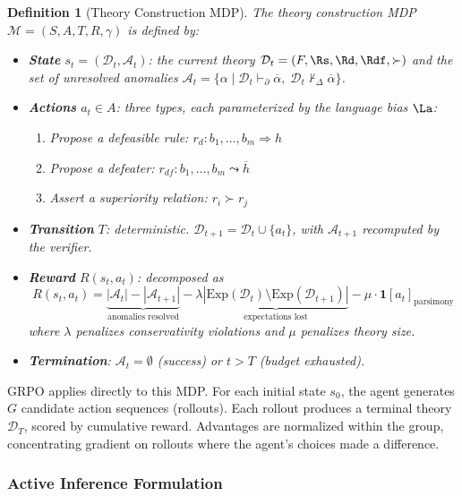 \documentclass[11pt]{article}
\newtheorem{definition}{Definition}
\newcommand{\D}{\mathcal{D}}
\newcommand{\Exp}{\mathrm{Exp}}
\newcommand{\pPartial}{\vdash_{\partial}}
\newcommand{\defto}{\Rightarrow}
\newcommand{\defeatto}{\leadsto}
\newcommand{\comp}[1]{\overline{#1}}
\begin{document}
\begin{definition}[Theory Construction MDP]
The theory construction MDP $\mathcal{M} = (S, A, T, R, \gamma)$ is defined by:
\begin{itemize}[nosep]
    \item \textbf{State} $s_t = (\D_t, \mathcal{A}_t)$: the current theory $\D_t = (F, \Rs, \Rd, \Rdf, {\succ})$ and the set of unresolved anomalies $\mathcal{A}_t = \{\alpha \mid \D_t \pPartial \comp{\alpha},\; \D_t \not\vdash_\Delta \comp{\alpha}\}$.
    \item \textbf{Actions} $a_t \in A$: three types, each parameterized by the language bias $\La$:
    \begin{enumerate}[nosep]
        \item Propose a defeasible rule: $r_d\colon b_1, \ldots, b_m \defto h$
        \item Propose a defeater: $r_{df}\colon b_1, \ldots, b_m \defeatto \comp{h}$
        \item Assert a superiority relation: $r_i \succ r_j$
    \end{enumerate}
    \item \textbf{Transition} $T$: deterministic. $\D_{t+1} = \D_t \cup \{a_t\}$, with $\mathcal{A}_{t+1}$ recomputed by the verifier.
    \item \textbf{Reward} $R(s_t, a_t)$: decomposed as
    \[
        R(s_t, a_t) = \underbrace{|\mathcal{A}_t| - |\mathcal{A}_{t+1}|}_{\text{anomalies resolved}} - \lambda \underbrace{|\Exp(\D_t) \setminus \Exp(\D_{t+1})|}_{\text{expectations lost}} - \mu \cdot \mathbf{1}[a_t]_{\text{parsimony}}
    \]
    where $\lambda$ penalizes conservativity violations and $\mu$ penalizes theory size.
    \item \textbf{Termination}: $\mathcal{A}_t = \emptyset$ (success) or $t > T$ (budget exhausted).
\end{itemize}
\end{definition}

GRPO applies directly to this MDP. For each initial state $s_0$, the agent generates $G$ candidate action sequences (rollouts). Each rollout produces a terminal theory $\D_T$, scored by cumulative reward. Advantages are normalized within the group, concentrating gradient on rollouts where the agent's choices made a difference.

\subsubsection{Active Inference Formulation}
\end{document}
